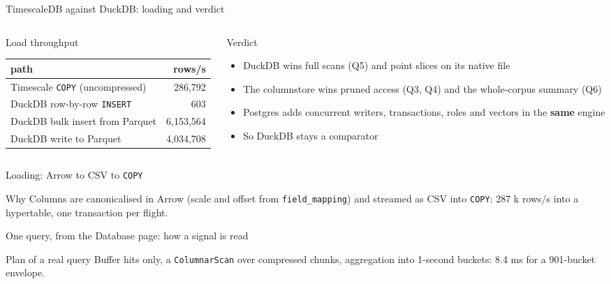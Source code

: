 \documentclass[aspectratio=169,10pt]{beamer}
\newcommand{\code}[1]{\texttt{\footnotesize #1}}
\newcommand{\listingr}[3]{}
\newcommand{\terminalr}[3]{}
\begin{document}
\begin{frame}[shrink=5]{TimescaleDB against DuckDB: loading and verdict}
\begin{columns}[T]
\begin{column}{0.47\textwidth}
\begin{block}{Load throughput}
\begin{tabular}{@{}lr@{}}
\toprule
path & rows/s\\
\midrule
Timescale \code{COPY} (uncompressed) & 286,792\\
DuckDB row-by-row \code{INSERT} & 603\\
DuckDB bulk insert from Parquet & 6,153,564\\
DuckDB write to Parquet & 4,034,708\\
\bottomrule
\end{tabular}
\end{block}
\end{column}
\begin{column}{0.51\textwidth}
\begin{block}{Verdict}
\begin{itemize}
  \item DuckDB wins full scans (Q5) and point slices on its native file
  \item The columnstore wins pruned access (Q3, Q4) and the whole-corpus summary (Q6)
  \item Postgres adds concurrent writers, transactions, roles and vectors in the \textbf{same} engine
  \item So DuckDB stays a comparator
\end{itemize}
\end{block}
\end{column}
\end{columns}
\end{frame}

\begin{frame}{Loading: Arrow to CSV to \code{COPY}}
\begin{block}{Why}
Columns are canonicalised in Arrow (scale and offset from \code{field\_mapping}) and streamed as CSV into \code{COPY}: 287 k rows/s into a hypertable, one transaction per flight.
\end{block}
\vspace{0.4em}
\listingr{code-copy}{1}{13}
\end{frame}

\begin{frame}{One query, from the Database page: how a signal is read}
\begin{block}{Plan of a real query}
Buffer hits only, a \texttt{ColumnarScan} over compressed chunks, aggregation into 1-second buckets: 8.4 ms for a 901-bucket envelope.
\end{block}
\vspace{0.3em}
\terminalr{term-plan-envelope}{1}{24}
\end{frame}
\end{document}
